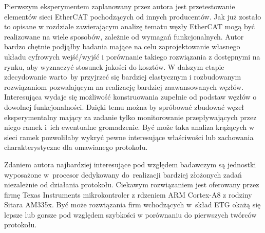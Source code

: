 Pierwszym eksperymentem zaplanowany przez autora jest przetestowanie elementów sieci EtherCAT pochodzących od innych producentów. 
Jak już zostało to opisane w rozdziale zawierającym analizę tematu węzły EtherCAT mogą być realizowane na wiele sposobów, zależnie od wymagań funkcjonalnych. Autor bardzo chętnie podjąłby badania mające na celu zaprojektowanie własnego układu cyfrowych wejść/wyjść i porównanie takiego rozwiązania z dostępnymi na rynku, aby wyznaczyć stosunek jakości do kosztów. W dalszym etapie zdecydowanie warto~by przyjrzeć się bardziej elastycznym i rozbudowanym rozwiązaniom pozwalającym na realizację bardziej zaawansowanych węzłów.
Interesująca wydaje się możliwość konstruowania zupełnie od podstaw węzłów o dowolnej funkcjonalności. Dzięki temu można by spróbować zbudować węzeł eksperymentalny mający za zadanie tylko monitorowanie przepływających przez niego ramek i~ich ewentualne gromadzenie. Być może taka analiza krążących w sieci ramek pozwoliłaby wykryć pewne interesujące właściwości lub zachowania charakterystyczne dla omawianego protokołu.

Zdaniem autora najbardziej interesujące pod względem badawczym są jednostki wyposażone w~procesor dedykowany do~realizacji bardziej złożonych zadań niezależnie od działania protokołu. Ciekawym rozwiązaniem jest oferowany przez firmę Texas Instruments mikrokontroler z rdzeniem ARM Cortex-A8 z rodziny Sitara AM335x. Być może rozwiązania firm wchodzących w~skład ETG okażą się lepsze lub gorsze pod względem szybkości w porównaniu do pierwszych twórców protokołu.

